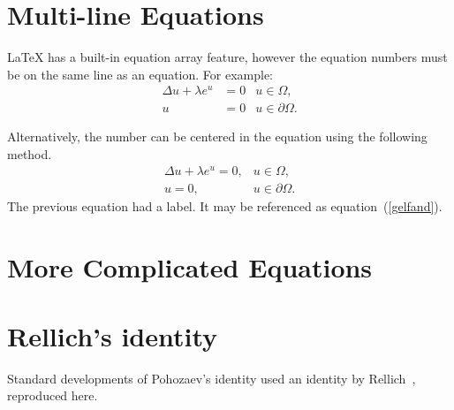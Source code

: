 \section{Multi-line Equations}

\LaTeX{} has a built-in equation array feature, however the
equation numbers must be on the same line as an equation.  For example:
\begin{eqnarray}
\Delta u + \lambda e^u &= 0&u\in \Omega,  \nonumber \\
u&=0&u\in\partial\Omega.
\end{eqnarray}

Alternatively, the number can be centered in the equation using the
following method.
%
%
\def\dd{\displaystyle}
\begin{equation}\label{gelfand}
\begin{array}{rl}
\dd \Delta u + \lambda e^u = 0, &
\dd u\in \Omega,\\[8pt] %
\dd u=0, & \dd u\in\partial\Omega.
\end{array}
\end{equation}
The previous equation had a label.  It may be referenced as
equation~(\ref{gelfand}).


\section{More Complicated Equations}
\section*{Rellich's identity}\label{rellich.section}
\setcounter{theorem}{0}
%
%

Standard developments of Pohozaev's identity used an identity by
Rellich~\cite{rellich:der40}, reproduced here.

